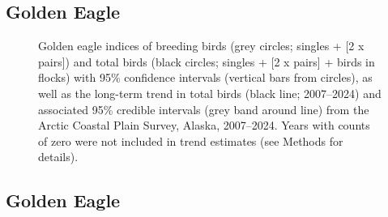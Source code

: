 \documentclass[
]{article}
\begin{document}
\newpage{}

\subsection*{Golden Eagle}\label{golden-eagle}

\begin{figure}


\caption{\label{fig-GOEA}Golden eagle indices of breeding birds (grey
circles; singles + {[}2 x pairs{]}) and total birds (black circles;
singles + {[}2 x pairs{]} + birds in flocks) with 95\% confidence
intervals (vertical bars from circles), as well as the long-term trend
in total birds (black line; 2007--2024) and associated 95\% credible
intervals (grey band around line) from the Arctic Coastal Plain Survey,
Alaska, 2007--2024. Years with counts of zero were not included in trend
estimates (see Methods for details).}

\end{figure}%

\newpage{}

\subsection*{Golden Eagle}\label{golden-eagle-1}

\begingroup\fontsize{10}{12}\selectfont
\end{document}

